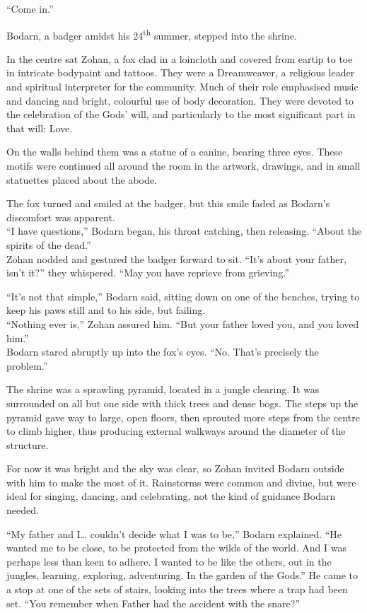 ``Come in.''

Bodarn, a badger amidst his 24\textsuperscript{th} summer, stepped into the shrine.

In the centre sat Zohan, a fox clad in a loincloth and covered from eartip to toe in intricate bodypaint and tattoos. They were a Dreamweaver, a religious leader and spiritual interpreter for the community. Much of their role emphasised music and dancing and bright, colourful use of body decoration. They were devoted to the celebration of the Gods' will, and particularly to the most significant part in that will: Love.

On the walls behind them was a statue of a canine, bearing three eyes. These motifs were continued all around the room in the artwork, drawings, and in small statuettes placed about the abode.

The fox turned and smiled at the badger, but this smile faded as Bodarn's discomfort was apparent.\\
``I have questions,'' Bodarn began, his throat catching, then releasing. ``About the spirits of the dead.''\\
Zohan nodded and gestured the badger forward to sit. ``It's about your father, isn't it?'' they whispered. ``May you have reprieve from grieving.''

``It's not that simple,'' Bodarn said, sitting down on one of the benches, trying to keep his paws still and to his side, but failing.\\
``Nothing ever is,'' Zohan assured him. ``But your father loved you, and you loved him.''\\
Bodarn stared abruptly up into the fox's eyes. ``No. That's precisely the problem.''

\secdiv

The shrine was a sprawling pyramid, located in a jungle clearing. It was surrounded on all but one side with thick trees and dense bogs. The steps up the pyramid gave way to large, open floors, then sprouted more steps from the centre to climb higher, thus producing external walkways around the diameter of the structure.

For now it was bright and the sky was clear, so Zohan invited Bodarn outside with him to make the most of it. Rainstorms were common and divine, but were ideal for singing, dancing, and celebrating, not the kind of guidance Bodarn needed.

``My father and I\ldots{} couldn't decide what I was to be,'' Bodarn explained. ``He wanted me to be close, to be protected from the wilds of the world. And I was perhaps less than keen to adhere. I wanted to be like the others, out in the jungles, learning, exploring, adventuring. In the garden of the Gods.'' He came to a stop at one of the sets of stairs, looking into the trees where a trap had been set. ``You remember when Father had the accident with the snare?''

